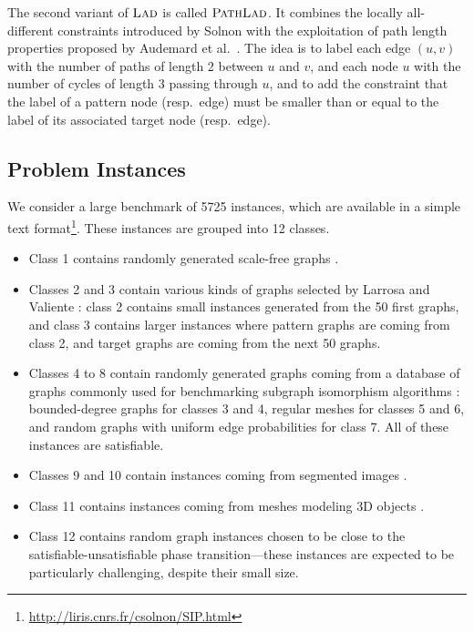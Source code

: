 \documentclass{llncs}
\newcommand{\LAD}{$\textsc{Lad}$\xspace}
\newcommand{\PathLAD}{$\textsc{PathLad}$\xspace}
\begin{document}
The second variant of \LAD is called \PathLAD. It combines the locally all-different constraints
introduced by Solnon \cite{Solnon:2010} with the exploitation of path length properties proposed by
Audemard et al.\ \cite{Audemard:2014}. The idea is to label each edge $(u,v)$ with the number of
paths of length 2 between $u$ and $v$, and each node $u$ with the number of cycles of length 3
passing through $u$, and to add the constraint that the label of a pattern node (resp.\ edge) must
be smaller than or equal to the label of its associated target node (resp.\ edge).


\subsection{Problem Instances}

We consider a large benchmark of 5725 instances, which are available in a simple text
format\footnote{\url{http://liris.cnrs.fr/csolnon/SIP.html}}. These instances are grouped into 12
classes.

\begin{itemize}
\item Class 1 contains randomly generated scale-free graphs \cite{constraints10}.
\item Classes 2 and 3 contain various kinds of graphs selected by Larrosa and Valiente \cite{LV02}:
    class 2 contains small instances generated from the 50 first graphs, and class 3 contains
    larger instances where pattern graphs are coming from class 2, and target graphs are coming from
    the next 50 graphs.
\item Classes 4 to 8 contain randomly generated graphs coming from a database of graphs commonly
    used for benchmarking subgraph isomorphism algorithms
    \cite{GraphDatabase1,GraphDatabase2}: bounded-degree graphs for classes 3 and 4, regular meshes
    for classes 5 and 6, and random graphs with uniform edge probabilities for class 7. All of these
    instances are satisfiable.
\item Classes 9 and 10 contain instances coming from segmented images \cite{pr15,cviu11}.
\item Class 11 contains instances coming from meshes modeling 3D objects \cite{cviu11}.
\item Class 12 contains random graph instances chosen to be close to the satisfiable-unsatisfiable
    phase transition---these instances are expected to be particularly challenging, despite their
    small size.
\end{itemize}
\end{document}
